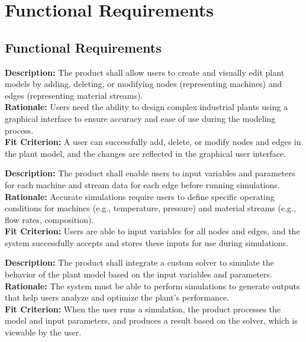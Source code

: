 \documentclass[12pt]{article}
\begin{document}
\section{Functional Requirements}
\subsection{Functional Requirements}
\begin{tcolorbox}[title=FR1]
  \textbf{Description:} The product shall allow users to create and visually edit plant models by adding, deleting, or modifying nodes (representing machines) and edges (representing material streams). \\
  \textbf{Rationale:} Users need the ability to design complex industrial plants using a graphical interface to ensure accuracy and ease of use during the modeling process. \\
  \textbf{Fit Criterion:} A user can successfully add, delete, or modify nodes and edges in the plant model, and the changes are reflected in the graphical user interface.
  \end{tcolorbox}
  
  \vspace{0.5cm}
  
  \begin{tcolorbox}[title=FR2]
  \textbf{Description:} The product shall enable users to input variables and parameters for each machine and stream data for each edge before running simulations. \\
  \textbf{Rationale:} Accurate simulations require users to define specific operating conditions for machines (e.g., temperature, pressure) and material streams (e.g., flow rates, composition). \\
  \textbf{Fit Criterion:} Users are able to input variables for all nodes and edges, and the system successfully accepts and stores these inputs for use during simulations.
  \end{tcolorbox}
  
  \vspace{0.5cm}
  
  \begin{tcolorbox}[title=FR3]
  \textbf{Description:} The product shall integrate a custom solver to simulate the behavior of the plant model based on the input variables and parameters. \\
  \textbf{Rationale:} The system must be able to perform simulations to generate outputs that help users analyze and optimize the plant's performance. \\
  \textbf{Fit Criterion:} When the user runs a simulation, the product processes the model and input parameters, and produces a result based on the solver, which is viewable by the user.
  \end{tcolorbox}
  
\end{document}
